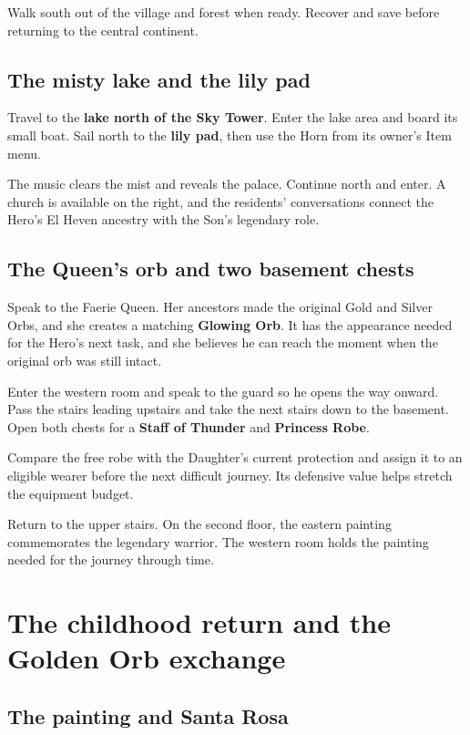 Walk south out of the village and forest when ready. Recover
and save before returning to the central continent.

\subsection*{The misty lake and the lily pad}

Travel to the \textbf{lake north of the Sky Tower}. Enter
the lake area and board its small boat. Sail north to the
\textbf{lily pad}, then use the Horn from its owner's Item menu.

The music clears the mist and reveals the palace. Continue
north and enter. A church is available on the right, and the
residents' conversations connect the Hero's El Heven ancestry
with the Son's legendary role.

\subsection*{The Queen's orb and two basement chests}

Speak to the Faerie Queen. Her ancestors made the original
Gold and Silver Orbs, and she creates a matching
\textbf{Glowing Orb}. It has the appearance needed for the
Hero's next task, and she believes he can reach the moment
when the original orb was still intact.

Enter the western room and speak to the guard so he opens the
way onward. Pass the stairs leading upstairs and take the
next stairs down to the basement. Open both chests for a
\textbf{Staff of Thunder} and \textbf{Princess Robe}.

Compare the free robe with the Daughter's current protection
and assign it to an eligible wearer before the next difficult
journey. Its defensive value helps stretch the equipment budget.

Return to the upper stairs. On the second floor, the eastern
painting commemorates the legendary warrior. The western
room holds the painting needed for the journey through time.

\section{The childhood return and the Golden Orb exchange}

\subsection*{The painting and Santa Rosa}

